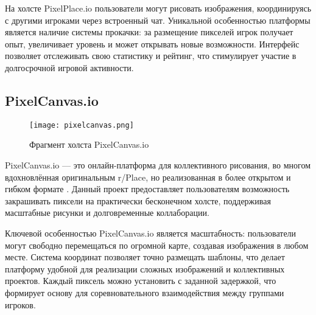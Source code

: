 На холсте PixelPlace.io пользователи могут рисовать изображения, координируясь с другими игроками через встроенный чат. Уникальной особенностью платформы является наличие системы прокачки: за размещение пикселей игрок получает опыт, увеличивает уровень и может открывать новые возможности. Интерфейс позволяет отслеживать свою статистику и рейтинг, что стимулирует участие в долгосрочной игровой активности.



\subsection{PixelCanvas.io}

\begin{figure}[H]
    \texttt{[image: pixelcanvas.png]}
    \caption{Фрагмент холста PixelCanvas.io}
\end{figure}

PixelCanvas.io --- это онлайн-платформа для коллективного рисования, во многом вдохновлённая оригинальным r/Place, но реализованная в более открытом и гибком формате \cite{pixelcanvas}. Данный проект предоставляет пользователям возможность закрашивать пиксели на практически бесконечном холсте, поддерживая масштабные рисунки и долговременные коллаборации.

Ключевой особенностью PixelCanvas.io является масштабность: пользователи могут свободно перемещаться по огромной карте, создавая изображения в любом месте. Система координат позволяет точно размещать шаблоны, что делает платформу удобной для реализации сложных изображений и коллективных проектов. Каждый пиксель можно установить с заданной задержкой, что формирует основу для соревновательного взаимодействия между группами игроков.


